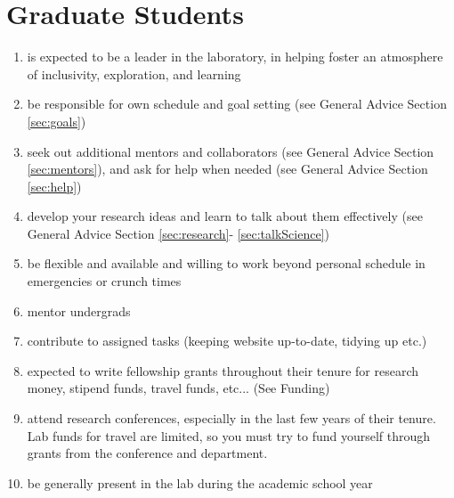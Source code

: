 \documentclass[12pt]{article}
\begin{document}
\section{Graduate Students}
\begin{enumerate}
\item is expected to be a leader in the laboratory, in helping foster
  an atmosphere of inclusivity, exploration, and  learning
\item be responsible for own schedule and goal setting (see General Advice
  Section \ref{sec:goals})
\item seek out additional mentors and collaborators (see General
  Advice Section \ref{sec:mentors}), and ask for help when needed (see
  General Advice Section \ref{sec:help})
\item develop your research ideas and learn to talk about them
  effectively (see General Advice Section \ref{sec:research}-
  \ref{sec:talkScience})
\item be flexible and available and willing to work beyond personal
  schedule in emergencies or crunch times
\item mentor undergrads
\item contribute to assigned tasks (keeping website up-to-date,
  tidying up etc.)
\item expected to write fellowship grants throughout their tenure for
  research money, stipend funds, travel funds, etc... (See Funding)
\item attend research conferences, especially in the last few years of
  their tenure. Lab funds for travel are limited, so you must try to
  fund yourself through grants from the conference and department.
\item be generally present in the lab during the academic school year
\end{enumerate}
\end{document}
